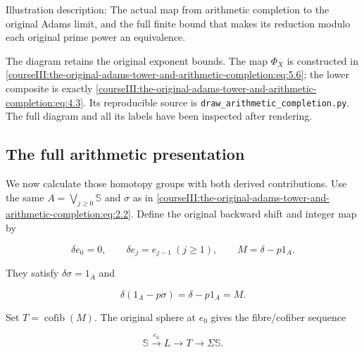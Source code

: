 Illustration description: The actual map from arithmetic completion to the original Adams limit, and the full finite bound that makes its reduction modulo each original prime power an equivalence.

The diagram retains the original exponent bounds. The map \(\Phi_X\) is constructed in \eqref{courseIII:the-original-adams-tower-and-arithmetic-completion:eq:5.6}; the lower composite is exactly \eqref{courseIII:the-original-adams-tower-and-arithmetic-completion:eq:4.3}. Its reproducible source is \texttt{draw\_arithmetic\_completion.py}. The full diagram and all its labels have been inspected after rendering.

\subsection{The full arithmetic presentation}
\label{courseIII:the-original-adams-tower-and-arithmetic-completion:arithmetic-original-presentation}

\label{courseIII:the-original-adams-tower-and-arithmetic-completion:section-6}\label{courseIII:adams-arithmetic:6}

We now calculate those homotopy groups with both derived contributions. Use the same \(A=\bigvee_{j\geq0}\mathbb S\) and \(\sigma\) as in \eqref{courseIII:the-original-adams-tower-and-arithmetic-completion:eq:2.2}. Define the original backward shift and integer map by

\begin{equation}
\delta e_0=0,\qquad \delta e_j=e_{j-1}\ (j\geq1),
\qquad M=\delta-p1_A.
\label{courseIII:the-original-adams-tower-and-arithmetic-completion:eq:6.1}
\end{equation}

They satisfy \(\delta\sigma=1_A\) and

\begin{equation}
\delta(1_A-p\sigma)=\delta-p1_A=M.
\label{courseIII:the-original-adams-tower-and-arithmetic-completion:eq:6.2}
\end{equation}

Set \(T=\operatorname{cofib}(M)\). The original sphere at \(e_0\) gives the fibre/cofiber sequence

\begin{equation}
\mathbb S\xrightarrow{e_0}L\longrightarrow T\longrightarrow\Sigma\mathbb S.
\label{courseIII:the-original-adams-tower-and-arithmetic-completion:eq:6.3}
\end{equation}

